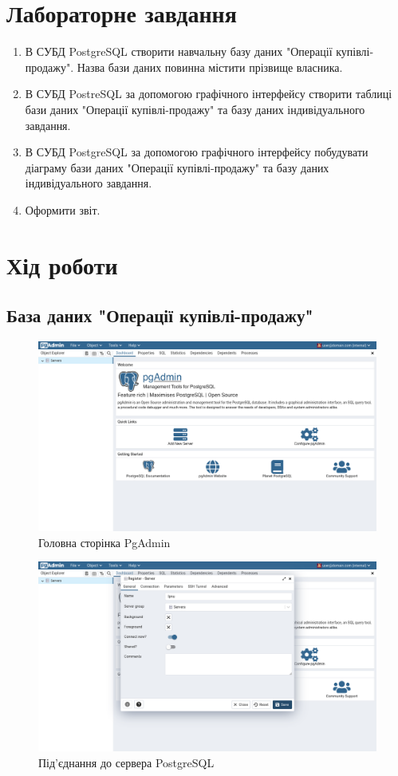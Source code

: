 \documentclass[14pt]{extreport}
\begin{document}
\begin{normalsize}
	\section*{Лабораторне завдання}
	\begin{enumerate}
		\item В СУБД PostgreSQL створити навчальну базу даних "Операції купівлі-продажу". Назва бази даних повинна містити прізвище власника.
		\item В СУБД PostreSQL за допомогою графічного інтерфейсу створити таблиці бази даних "Операції купівлі-продажу" та базу даних індивідуального завдання.
		\item В СУБД PostgreSQL за допомогою графічного інтерфейсу побудувати діаграму бази даних "Операції купівлі-продажу" та базу даних індивідуального завдання.
		\item Оформити звіт.
	\end{enumerate}
	
	\section*{Хід роботи}
	\subsection*{База даних "Операції купівлі-продажу"}
	
	\begin{figure}[H]
		\centering
		\includegraphics[scale=0.35]{1}
		\caption{Головна сторінка PgAdmin}
	\end{figure}

	\begin{figure}[H]
		\centering
		\includegraphics[scale=0.35]{2}
		\caption{Під'єднання до сервера PostgreSQL}
	\end{figure}
	

\end{normalsize}
\end{document}
